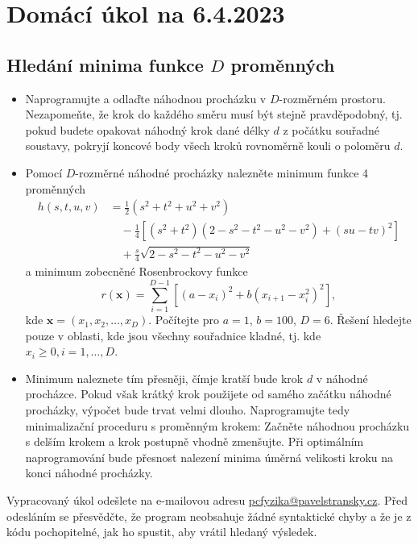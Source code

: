 \documentclass[a4paper,11pt,twoside]{article}
\def\vector#1{\boldsymbol{#1}}								%
\begin{document}
\section*{Domácí úkol na 6.4.2023}
\subsection*{Hledání minima funkce $D$ proměnných}
\begin{itemize}
    \item
        Naprogramujte a odlaďte náhodnou procházku v $D$-rozměrném prostoru. 
        Nezapomeňte, že krok do každého směru musí být stejně pravděpodobný, tj. pokud budete opakovat náhodný krok dané délky $d$ z počátku souřadné soustavy, pokryjí koncové body všech kroků rovnoměrně kouli o poloměru $d$.

    \item
        Pomocí $D$-rozměrné náhodné procházky nalezněte minimum funkce 4 proměnných
        \begin{align*}
            h(s,t,u,v)&=\frac{1}{2}\left(s^2+t^2+u^2+v^2\right)\\
            &\quad-\frac{1}{4}\left[\left(s^2+t^2\right)\left(2-s^2-t^2-u^2-v^2\right)+\left(su-tv\right)^{2}\right]\\
            &\quad+\frac{s}{4}\sqrt{2-s^{2}-t^{2}-u^{2}-v^{2}}
        \end{align*}
        a minimum zobecněné Rosenbrockovy funkce
        \begin{equation}
            r(\vector{x})=\sum_{i=1}^{D-1}\left[\left(a-x_{i}\right)^{2}+b\left(x_{i+1}-x_{i}^{2}\right)^{2}\right],
        \end{equation}
        kde $\vector{x}=(x_{1},x_{2},\dotsc,x_{D})$. 
        Počítejte pro $a=1$, $b=100$, $D=6$. 
        Řešení hledejte pouze v oblasti, kde jsou všechny souřadnice kladné, tj. kde $x_i\geq0,i=1,\dotsc,D$.

    \item
        Minimum naleznete tím přesněji, čímje kratší bude krok $d$ v náhodné procházce. 
        Pokud však krátký krok použijete od samého začátku náhodné procházky, výpočet bude trvat velmi dlouho. 
        Naprogramujte tedy minimalizační proceduru s proměnným krokem: Začněte náhodnou procházku s delším krokem a krok postupně vhodně zmenšujte. 
        Při optimálním naprogramování bude přesnost nalezení minima úměrná velikosti kroku na konci náhodné procházky.
\end{itemize}

Vypracovaný úkol odešlete na e-mailovou adresu \href{mailto:pcfyzika@pavelstransky.cz}{pcfyzika@pavelstransky.cz}.
Před odesláním se přesvědčte, že program neobsahuje žádné syntaktické chyby a že je z kódu pochopitelné, jak ho spustit, aby vrátil hledaný výsledek.
\end{document}
